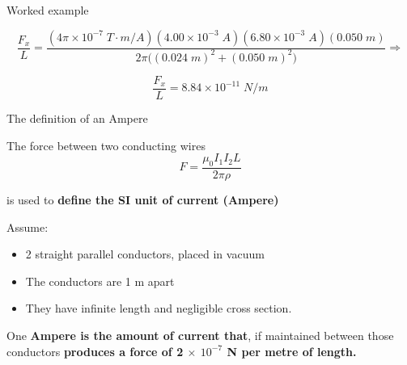 {\begin{frame}{Worked example}
{\begin{equation*}
 \frac{F_x}{L} =
    \frac{ (4\pi \times 10^{-7} \; T \cdot m/A)
              (4.00 \times 10^{-3}\; A)
              (6.80 \times 10^{-3}\; A)
              (0.050 \; m)}
          {2\pi \Big( (0.024\; m)^2+(0.050\; m)^2 \Big)} \Rightarrow
\end{equation*}

\begin{equation*}
 \frac{F_x}{L} = 8.84 \times 10^{-11} \; N/m
\end{equation*}

}
\end{frame}

} %


%
%
%

\begin{frame}{The definition of an Ampere}

The force between two conducting wires
\begin{equation*}
   F = \frac{\mu_0 I_{1} I_{2} L}{2\pi \rho}
\end{equation*}

is used to {\bf define the SI unit of current (Ampere)}\\

\vspace{0.3cm}

Assume:
\begin{itemize}
  \item 2 straight parallel conductors, placed in vacuum
  \item The conductors are 1 m apart
  \item They have infinite length and negligible cross section.\\
\end{itemize}

\vspace{0.3cm}

One {\bf Ampere is the amount of current that},
if maintained between those conductors {\bf produces a force of 2 $\times$ $10^{-7}$ N per metre of length.}

\end{frame}

%
%
%

